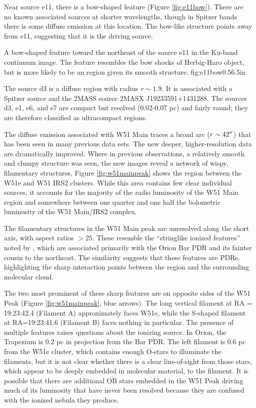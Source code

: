 Near source e11, there is a bow-shaped feature (Figure \ref{fig:e11bow}).
There are no known associated sources at shorter wavelengths, though in Spitzer
bands there is some diffuse emission at this location.  The bow-like structure
points away from e11, suggesting that it is the driving source.

{A bow-shaped feature toward the northeast of the source e11 in the Ku-band
continuum image.  The feature resembles the bow shocks of Herbig-Haro object,
but is more likely to be an \hii region given its smooth structure.}
{fig:e11bow}{0.5}{6.5in}

The source d3 is a diffuse \hii region with radius $r\sim1.9$\arcsec.  It is
associated with a Spitzer source and the 2MASS source 2MASX J19233591+1431288.
The sources d3, e1, e6, and e7 are compact but resolved (0.02-0.07 pc) and
fairly round; they are therefore classified as ultracompact \hii regions.

The diffuse emission associated with W51 Main traces a broad arc
($r\sim42\mbox{$^{\prime\prime}$}$) that has been seen in many previous data sets.  The new
deeper, higher-resolution data are dramatically improved.  Where in previous
observations, a relatively smooth and clumpy structure was seen, the new images
reveal a network of wispy, filamentary structures.  Figure
\ref{fig:w51mainpeak} shows the region between the W51e and W51 IRS2 clusters.
While this area contains few clear individual sources, it accounts for the
majority of the radio luminosity of the W51 Main region and somewhere between
one quarter and one half the bolometric luminosity of the W51 Main/IRS2 complex.

The filamentary structures in the W51 Main peak are unresolved along the short
axis, with aspect ratios $>25$.   These resemble the ``stringlike ionized
features'' noted by \citet[][see
\url{http://images.nrao.edu/402}]{Yusef-Zadeh1990a}, which are associated
primarily with the Orion Bar PDR and its fainter cousin to the northeast.  The
similarity suggests that these features are PDRs, highlighting the sharp
interaction points between the \hii region and the surrounding molecular cloud.

The two most prominent of these sharp features are on opposite sides of the W51
Peak (Figure \ref{fig:w51mainpeak}, blue arrows).  The long vertical filament
at RA = 19:23:42.4 (Filament A) approximately faces W51e, while the S-shaped
filament at RA=19:23:41.6 (Filament B) faces nothing in particular.  The
presence of multiple features raises questions about the ionizing source.  In
Orion, the Trapezium is 0.2 pc in projection from the Bar PDR.  The left
filament is 0.6 pc from the W51e cluster, which contains enough O-stars to
illuminate the filaments, but it is not clear whether there is a clear
line-of-sight from those stars, which appear to be deeply embedded in molecular
material, to the filament.  It is possible that there are additional OB stars
embedded in the W51 Peak driving much of its luminosity that have never been
resolved because they are confused with the ionized nebula they produce.

